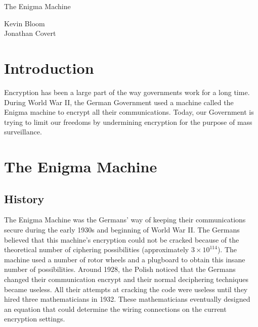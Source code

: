\documentclass[12pt,a4paper,titlepage]{article}
\begin{document}
\pagestyle{headings}
\setcounter{page}{1}

\thispagestyle{empty}

\begin{flushleft}
\vspace*{1.5in}

{\huge The Enigma Machine}

\vspace{0.25in}

{\Large Kevin Bloom \\ Jonathan Covert}

\vspace{0.25in}

\vfill

\end{flushleft}

\newpage

\tableofcontents

\newpage

\section{Introduction}
Encryption has been a large part of the way governments work for a long time.  
During World War II, the German Government used a machine called the Enigma 
machine to encrypt all their communications. Today, our Government is trying to 
limit our freedoms by undermining encryption for the purpose of mass 
surveillance.

\section{The Enigma Machine}

\subsection{History}
The Enigma Machine was the Germans' way of keeping their communications secure 
during the early 1930s and beginning of World War II. The Germans believed that 
this machine's encryption could not be cracked because of the theoretical number 
of ciphering possibilities (approximately $3 \times 10^{114}$). The machine used 
a number of rotor wheels and a plugboard to obtain this insane number of 
possibilities. Around 1928, the Polish noticed that the Germans changed their 
communication encrypt and their normal deciphering techniques became useless. 
All their attempts at cracking the code were useless until they hired three 
mathematicians in 1932. These mathematicians eventually designed an equation 
that could determine the wiring connections on the current encryption 
settings.
\end{document}
